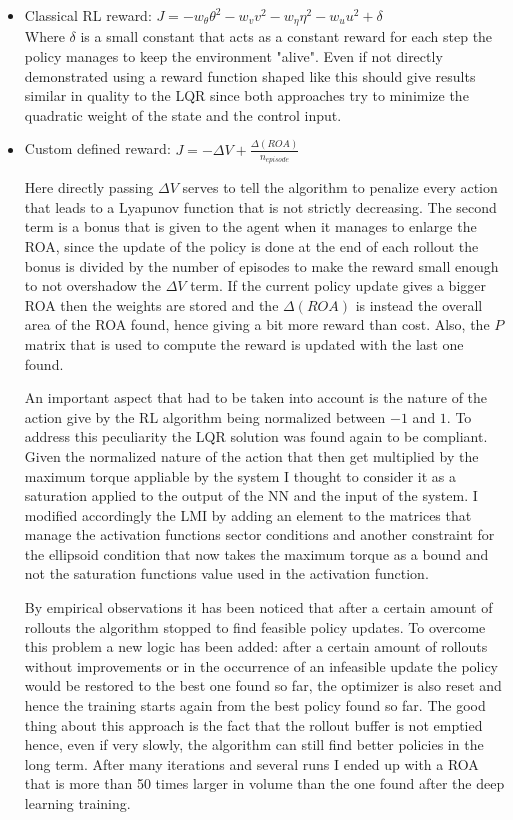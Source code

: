 \documentclass{article}
\begin{document}
\begin{itemize}
  \item Classical RL reward: $J = -w_{\theta} \theta^2 - w_{v} v^2 - w_{\eta} \eta^2 - w_{u} u^2 + \delta$\\
  Where $\delta$ is a small constant that acts as a constant reward for each step the policy manages to keep the environment "alive". Even if not directly demonstrated using a reward function shaped like this should give results similar in quality to the LQR since both approaches try to minimize the quadratic weight of the state and the control input. 
  \item Custom defined reward: $J = - \Delta V + \frac{\Delta(ROA)}{n_{episode}}$
  
  Here directly passing $\Delta V$ serves to tell the algorithm to penalize every action that leads to a Lyapunov function that is not strictly decreasing. The second term is a bonus that is given to the agent when it manages to enlarge the ROA, since the update of the policy is done at the end of each rollout the bonus is divided by the number of episodes to make the reward small enough to not overshadow the $\Delta V$ term. If the current policy update gives a bigger ROA then the weights are stored and the $\Delta(ROA)$ is instead the overall area of the ROA found, hence giving a bit more reward than cost. Also, the $P$ matrix that is used to compute the reward is updated with the last one found.

  An important aspect that had to be taken into account is the nature of the action give by the RL algorithm being normalized between $-1$ and $1$. To address this peculiarity the LQR solution was found again to be compliant. Given the normalized nature of the action that then get multiplied by the maximum torque appliable by the system I thought to consider it as a saturation applied to the output of the NN and the input of the system. I modified accordingly the LMI by adding an element to the matrices that manage the activation functions sector conditions and another constraint for the ellipsoid condition that now takes the maximum torque as a bound and not the saturation functions value used in the activation function.

  By empirical observations it has been noticed that after a certain amount of rollouts the algorithm stopped to find feasible policy updates. To overcome this problem a new logic has been added: after a certain amount of rollouts without improvements or in the occurrence of an infeasible update the policy would be restored to the best one found so far, the optimizer is also reset and hence the training starts again from the best policy found so far. The good thing about this approach is the fact that the rollout buffer is not emptied hence, even if very slowly, the algorithm can still find better policies in the long term. After many iterations and several runs I ended up with a ROA that is more than 50 times larger in volume than the one found after the deep learning training.
\end{itemize}
\end{document}
